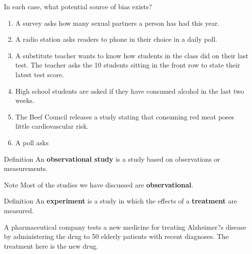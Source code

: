\documentclass{beamer}
\begin{document}
\begin{frame}
\begin{example}
In each case, what potential source of bias exists?
\begin{enumerate}
\item<1->  A survey asks how many sexual partners a person has had this year. \\
\item<3->  A radio station asks readers to phone in their choice in a daily poll. \\
\item<5-> A substitute teacher wants to know how students in the class did on their last test. The teacher asks the 10 students sitting in the front row to state their latest test score.
\item<7-> High school students are asked if they have consumed alcohol in the last two weeks.
\item<9-> The Beef Council releases a study stating that consuming red meat poses little cardiovascular risk.
\item<11-> A poll asks  \\
\end{enumerate}
\end{example}
\end{frame}

\begin{frame}
\begin{block}{Definition}
An \textbf{observational study} is a study based on observations or measurements.
\end{block}\pause

\begin{block}{Note}
Most of the studies we have discussed are \textbf{observational}.
\end{block}\pause

\begin{block}{Definition}
An \textbf{experiment} is a study in which the effects of a \textbf{treatment} are measured.
\end{block}\pause

\begin{example}
A pharmaceutical company tests a new medicine for treating Alzheimer?s disease by administering the drug to 50 elderly patients with recent diagnoses. The treatment here is the new drug.
\end{example}
\end{frame}
\end{document}

